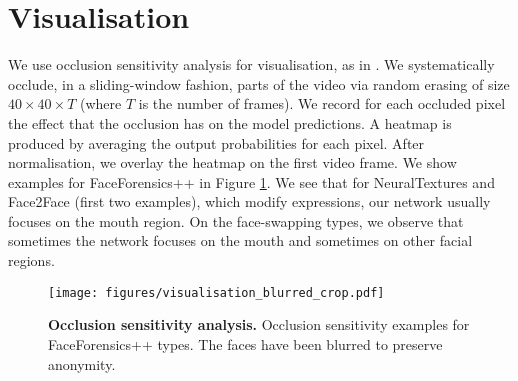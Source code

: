 \documentclass[10pt,twocolumn,letterpaper]{article}
\begin{document}
\section{Visualisation}
We use occlusion sensitivity analysis \cite{zeiler2014visualizing} for visualisation, as in \cite{haliassos2021lips}. We systematically occlude, in a sliding-window fashion, parts of the video via random erasing of size $40\times 40\times T$ (where $T$ is the number of frames). We record for each occluded pixel the effect that the occlusion has on the model predictions. A heatmap is produced by averaging the output probabilities for each pixel. After normalisation, we overlay the heatmap on the first video frame. We show examples for FaceForensics++ in Figure \ref{fig:occlusion_sensitivity}. We see that for NeuralTextures and Face2Face (first two examples), which modify expressions, our network usually focuses on the mouth region. On the face-swapping types, we observe that sometimes the network focuses on the mouth and sometimes on other facial regions.

\begin{figure}
\centering
  \centerline{\texttt{[image: figures/visualisation\_blurred\_crop.pdf]}}
 \caption{\textbf{Occlusion sensitivity analysis.} Occlusion sensitivity examples for FaceForensics++ types. The faces have been blurred to preserve anonymity.}
 \label{fig:occlusion_sensitivity}
\end{figure}
\end{document}
